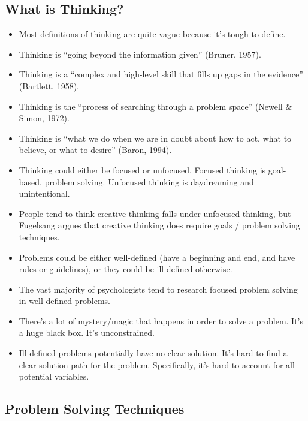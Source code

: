 \documentclass[]{article}
\begin{document}
		\subsection{What is Thinking?}
			\begin{itemize}
				\item Most definitions of thinking are quite vague because it's tough to define.
				\item Thinking is ``going beyond the information given'' (Bruner, 1957).
				\item Thinking is a ``complex and high-level skill that fills up gaps in the evidence'' (Bartlett, 1958).
				\item Thinking is the ``process of searching through a problem space'' (Newell \& Simon, 1972).
				\item Thinking is ``what we do when we are in doubt about how to act, what to believe, or what to desire'' (Baron, 1994).
				\item Thinking could either be focused or unfocused. Focused thinking is goal-based, problem solving. Unfocused thinking is daydreaming and unintentional.
				\item People tend to think creative thinking falls under unfocused thinking, but Fugelsang argues that creative thinking does require goals / problem solving techniques.
				\item Problems could be either well-defined (have a beginning and end, and have rules or guidelines), or they could be ill-defined otherwise.
				\item The vast majority of psychologists tend to research focused problem solving in well-defined problems. 
				\item There's a lot of mystery/magic that happens in order to solve a problem. It's a huge black box. It's unconstrained.
				\item Ill-defined problems potentially have no clear solution. It's hard to find a clear solution path for the problem. Specifically, it's hard to account for all potential variables.
			\end{itemize}

		\subsection{Problem Solving Techniques}
\end{document}
